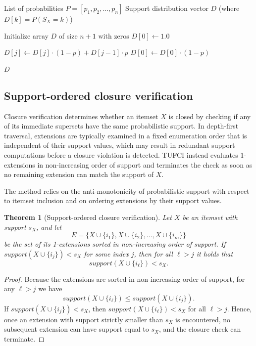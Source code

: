 \documentclass[10pt,letterpaper]{article}
\newtheorem{theorem}{Theorem}
\begin{document}
\begin{algorithm}[!h]
\caption{DirectConvolutionSupport}
\label{alg:direct_conv}
\begin{algorithmic}[1]
\small
\REQUIRE List of probabilities $P = [p_1, p_2, \ldots, p_n]$
\ENSURE Support distribution vector $D$ (where $D[k] = P(S_X=k)$)

\STATE Initialize array $D$ of size $n+1$ with zeros
\STATE $D[0] \leftarrow 1.0$ 

        \STATE $D[j] \leftarrow D[j] \cdot (1 - p) + D[j-1] \cdot p$
    \ENDFOR
    \STATE $D[0] \leftarrow D[0] \cdot (1 - p)$
\ENDFOR

\RETURN $D$
\end{algorithmic}
\end{algorithm}



\subsection*{Support-ordered closure verification}
\label{subsec:closure_verification}

Closure verification determines whether an itemset $X$ is closed by checking if any of its immediate supersets have the same probabilistic support. In depth-first traversal, extensions are typically examined in a fixed enumeration order that is independent of their support values, which may result in redundant support computations before a closure violation is detected. TUFCI instead evaluates 1-extensions in non-increasing order of support and terminates the check as soon as no remaining extension can match the support of $X$.

The method relies on the anti-monotonicity of probabilistic support with respect to itemset inclusion and on ordering extensions by their support values.

\begin{theorem}[Support-ordered closure verification]
\label{thm:closure}
Let $X$ be an itemset with support $s_X$, and let 
\[
E = \{X \cup \{i_1\}, X \cup \{i_2\}, \ldots, X \cup \{i_m\}\}
\]
be the set of its 1-extensions sorted in non-increasing order of support. If $\mathit{support}(X \cup \{i_j\}) < s_X$ for some index $j$, then for all $\ell > j$ it holds that
\[
\mathit{support}(X \cup \{i_\ell\}) < s_X .
\]
\end{theorem}

\begin{proof}
Because the extensions are sorted in non-increasing order of support, for any $\ell > j$ we have
\[
\mathit{support}(X \cup \{i_\ell\}) \le \mathit{support}(X \cup \{i_j\}) .
\]
If $\mathit{support}(X \cup \{i_j\}) < s_X$, then $\mathit{support}(X \cup \{i_\ell\}) < s_X$ for all $\ell > j$. Hence, once an extension with support strictly smaller than $s_X$ is encountered, no subsequent extension can have support equal to $s_X$, and the closure check can terminate.
\end{proof}
\end{document}
